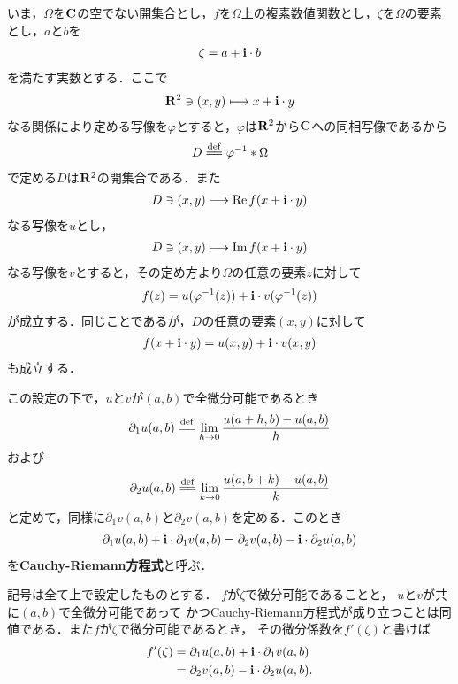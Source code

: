 	いま，$\Omega$を$\mathbf{C}$の空でない開集合とし，$f$を$\Omega$上の複素数値関数とし，$\zeta$を$\Omega$の要素とし，$a$と$b$を
	\begin{align}
		\zeta = a + \mathbf{i} \cdot b
	\end{align}
	を満たす実数とする．ここで
	\begin{align}
		\mathbf{R}^2 \ni (x,y) \longmapsto x + \mathbf{i} \cdot y
	\end{align}
	なる関係により定める写像を$\varphi$とすると，$\varphi$は$\mathbf{R}^2$から$\mathbf{C}$への同相写像であるから
	\begin{align}
		D \defeq \varphi^{-1} \ast \Omega
	\end{align}
	で定める$D$は$\mathbf{R}^2$の開集合である．また
	\begin{align}
		D \ni (x,y) \longmapsto \operatorname{Re} f(x + \mathbf{i} \cdot y)
	\end{align}
	なる写像を$u$とし，
	\begin{align}
		D \ni (x,y) \longmapsto \operatorname{Im} f(x + \mathbf{i} \cdot y)
	\end{align}
	なる写像を$v$とすると，その定め方より$\Omega$の任意の要素$z$に対して
	\begin{align}
		f(z) = u(\varphi^{-1}(z)) + \mathbf{i} \cdot v(\varphi^{-1}(z))
	\end{align}
	が成立する．同じことであるが，$D$の任意の要素$(x,y)$に対して
	\begin{align}
		f(x + \mathbf{i} \cdot y) = u(x,y) + \mathbf{i} \cdot v(x,y)
	\end{align}
	も成立する．
	
	この設定の下で，$u$と$v$が$(a,b)$で全微分可能であるとき
	\begin{align}
		\partial_1 u(a,b) \defeq \lim_{h \to 0} \frac{u(a+h,b) - u(a,b)}{h}
	\end{align}
	および
	\begin{align}
		\partial_2 u(a,b) \defeq \lim_{k \to 0} \frac{u(a,b+k) - u(a,b)}{k}
	\end{align}
	と定めて，同様に$\partial_1 v(a,b)$と$\partial_2 v(a,b)$を定める．このとき
	\begin{align}
		\partial_1 u(a,b) + \mathbf{i} \cdot \partial_1 v(a,b)
		= \partial_2 v(a,b) - \mathbf{i} \cdot \partial_2 u(a,b)
	\end{align}
	を{\bf Cauchy-Riemann方程式}と呼ぶ．
	
	\begin{screen}
		\begin{thm}
			記号は全て上で設定したものとする．
			$f$が$\zeta$で微分可能であることと，
			$u$と$v$が共に$(a,b)$で全微分可能であって
			かつCauchy-Riemann方程式が成り立つことは同値である．また$f$が$\zeta$で微分可能であるとき，
			その微分係数を$f'(\zeta)$と書けば
			\begin{align}
				f'(\zeta) &= \partial_1 u(a,b) + \mathbf{i} \cdot \partial_1 v(a,b) \\
				&= \partial_2 v(a,b) - \mathbf{i} \cdot \partial_2 u(a,b).
			\end{align}
		\end{thm}
	\end{screen}
	
